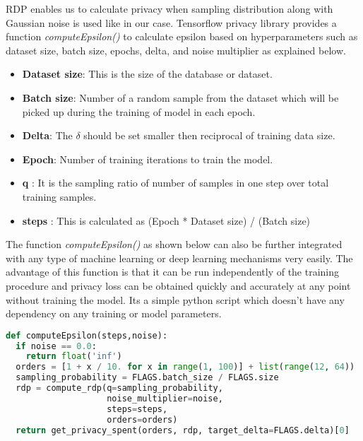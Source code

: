 RDP enables us to calculate privacy when sampling distribution along with Gaussian noise is used like in our case. Tensorflow privacy library \cite{11} provides a function \textit{computeEpsilon()} to calculate epsilon based on hyperparameters such as dataset size, batch size, epochs, delta, and noise multiplier as explained below.
\begin{itemize}
    \item \textbf{Dataset size}: This is the size of the database or dataset.
    \vspace{-0.3cm}\item \textbf{Batch size}: Number of a random sample from the dataset which will be picked up during the training of model in each epoch.
    \vspace{-0.3cm}\item \textbf{Delta}: The $\delta$ should be set smaller then reciprocal of training data size.
    \vspace{-0.3cm}\item \textbf{Epoch}: Number of training iterations to train the model.
    \vspace{-0.3cm}\item \textbf{q} : It is the sampling ratio of number of samples in one step over total training samples. 
    \vspace{-0.3cm}\item \textbf{steps} : This is calculated as (Epoch * Dataset size) / (Batch size)
\end{itemize}

The function \textit{computeEpsilon()} as shown below can also be further integrated with any type of machine learning or deep learning mechanisms very easily. The advantage of this function is that it can be run independently of the training procedure and privacy loss can be obtained quickly and accurately at any point without training the model. Its a simple python script which doesn't have any dependency on any training or model parameters. 
\linebreak 
\begin{lstlisting}[language=Python]
def computeEpsilon(steps,noise):
  if noise == 0.0:
    return float('inf')
  orders = [1 + x / 10. for x in range(1, 100)] + list(range(12, 64))
  sampling_probability = FLAGS.batch_size / FLAGS.size
  rdp = compute_rdp(q=sampling_probability,
                    noise_multiplier=noise,
                    steps=steps,
                    orders=orders)
  return get_privacy_spent(orders, rdp, target_delta=FLAGS.delta)[0]
\end{lstlisting}
